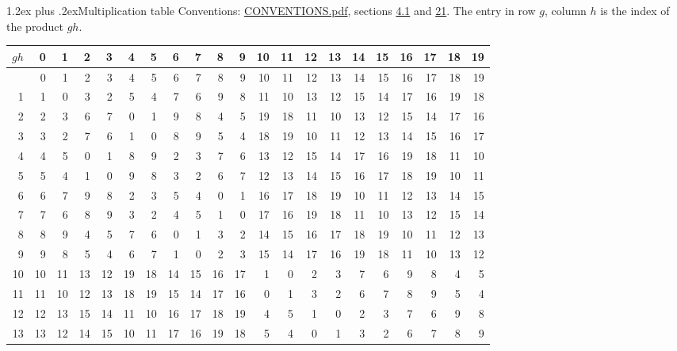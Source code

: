 \documentclass[10pt,a4paper]{article}
\makeatletter
\renewcommand\section{\@startsection{section}{1}{\z@}{-3ex plus -1ex minus -.2ex}%
  {1.2ex plus .2ex}{\normalfont\large\sffamily\bfseries\color{parttitle}}}
\numberwithin{equation}{section}
\makeatother
\begin{document}
\section{Multiplication table}\label{s:multiplication}
Conventions: \href{../../CONVENTIONS.pdf}{CONVENTIONS.pdf}, sections \href{../../../rotation/CONVENTIONS.pdf\#conv.4.1}{4.1} and \href{../../CONVENTIONS.pdf\#conv.21}{21}.
The entry in row $g$, column $h$ is the index of the product $gh$.
{\normalsize\setlength{\tabcolsep}{0.1em}\setlength{\LTleft}{-8pt plus 1fill}\setlength{\LTright}{-8pt plus 1fill}\begin{longtable}{@{}r|rrrrrrrrrrrrrrrrrrrr@{}}\toprule
$gh$ & 0 & 1 & 2 & 3 & 4 & 5 & 6 & 7 & 8 & 9 & 10 & 11 & 12 & 13 & 14 & 15 & 16 & 17 & 18 & 19\\\midrule\endhead
\bottomrule\endfoot\endlastfoot
0 & 0 & 1 & 2 & 3 & 4 & 5 & 6 & 7 & 8 & 9 & 10 & 11 & 12 & 13 & 14 & 15 & 16 & 17 & 18 & 19\\*
1 & 1 & 0 & 3 & 2 & 5 & 4 & 7 & 6 & 9 & 8 & 11 & 10 & 13 & 12 & 15 & 14 & 17 & 16 & 19 & 18\\
2 & 2 & 3 & 6 & 7 & 0 & 1 & 9 & 8 & 4 & 5 & 19 & 18 & 11 & 10 & 13 & 12 & 15 & 14 & 17 & 16\\
3 & 3 & 2 & 7 & 6 & 1 & 0 & 8 & 9 & 5 & 4 & 18 & 19 & 10 & 11 & 12 & 13 & 14 & 15 & 16 & 17\\
4 & 4 & 5 & 0 & 1 & 8 & 9 & 2 & 3 & 7 & 6 & 13 & 12 & 15 & 14 & 17 & 16 & 19 & 18 & 11 & 10\\
5 & 5 & 4 & 1 & 0 & 9 & 8 & 3 & 2 & 6 & 7 & 12 & 13 & 14 & 15 & 16 & 17 & 18 & 19 & 10 & 11\\
6 & 6 & 7 & 9 & 8 & 2 & 3 & 5 & 4 & 0 & 1 & 16 & 17 & 18 & 19 & 10 & 11 & 12 & 13 & 14 & 15\\
7 & 7 & 6 & 8 & 9 & 3 & 2 & 4 & 5 & 1 & 0 & 17 & 16 & 19 & 18 & 11 & 10 & 13 & 12 & 15 & 14\\
8 & 8 & 9 & 4 & 5 & 7 & 6 & 0 & 1 & 3 & 2 & 14 & 15 & 16 & 17 & 18 & 19 & 10 & 11 & 12 & 13\\
9 & 9 & 8 & 5 & 4 & 6 & 7 & 1 & 0 & 2 & 3 & 15 & 14 & 17 & 16 & 19 & 18 & 11 & 10 & 13 & 12\\
10 & 10 & 11 & 13 & 12 & 19 & 18 & 14 & 15 & 16 & 17 & 1 & 0 & 2 & 3 & 7 & 6 & 9 & 8 & 4 & 5\\
11 & 11 & 10 & 12 & 13 & 18 & 19 & 15 & 14 & 17 & 16 & 0 & 1 & 3 & 2 & 6 & 7 & 8 & 9 & 5 & 4\\
12 & 12 & 13 & 15 & 14 & 11 & 10 & 16 & 17 & 18 & 19 & 4 & 5 & 1 & 0 & 2 & 3 & 7 & 6 & 9 & 8\\
13 & 13 & 12 & 14 & 15 & 10 & 11 & 17 & 16 & 19 & 18 & 5 & 4 & 0 & 1 & 3 & 2 & 6 & 7 & 8 & 9\\

\end{longtable}}
\end{document}
